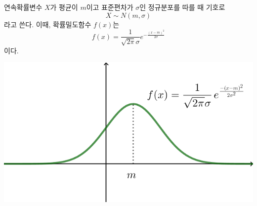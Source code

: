 \documentclass[t,8pt]{beamer}
\begin{document}
\begin{frame}[t]{\subsecname}
\begin{minipage}{.6\textwidth}
연속확률변수 \(X\)가 평균이 \(m\)이고 표준편차가 \(\sigma\)인 정규분포를 따를 때 기호로
\[X\sim N(m,\sigma)\]
라고 쓴다.
이때, 확률밀도함수 \(f(x)\)는
\[f(x)=\frac1{\sqrt{2\pi}\sigma}e^{-\frac{(x-m)^2}{2\sigma}}\]
이다.
\end{minipage}
\begin{minipage}{.37\textwidth}
\includegraphics[width=\textwidth]{img/3-2-1}
\end{minipage}
\end{frame}
\end{document}
